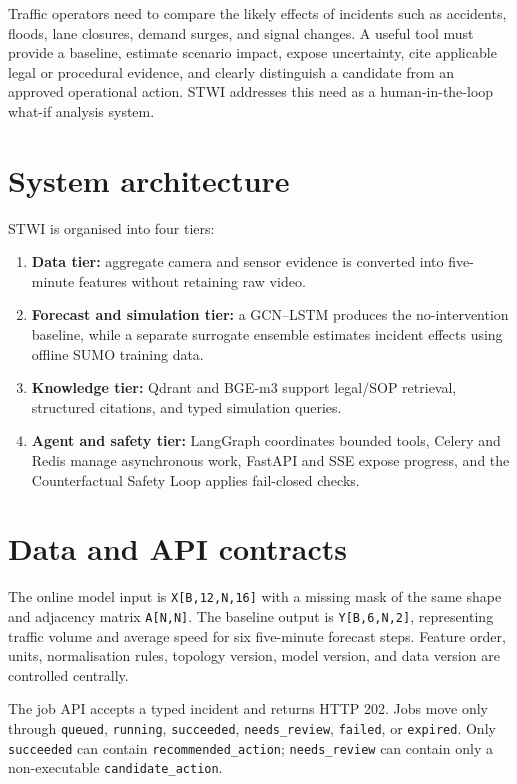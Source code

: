 \documentclass[12pt,a4paper]{report}
\begin{document}
Traffic operators need to compare the likely effects of incidents such as accidents, floods, lane closures, demand surges, and signal changes. A useful tool must provide a baseline, estimate scenario impact, expose uncertainty, cite applicable legal or procedural evidence, and clearly distinguish a candidate from an approved operational action. STWI addresses this need as a human-in-the-loop what-if analysis system.

\section{System architecture}

STWI is organised into four tiers:

\begin{enumerate}[leftmargin=1.2cm]
  \item \textbf{Data tier:} aggregate camera and sensor evidence is converted into five-minute features without retaining raw video.
  \item \textbf{Forecast and simulation tier:} a GCN--LSTM produces the no-intervention baseline, while a separate surrogate ensemble estimates incident effects using offline SUMO training data.
  \item \textbf{Knowledge tier:} Qdrant and BGE-m3 support legal/SOP retrieval, structured citations, and typed simulation queries.
  \item \textbf{Agent and safety tier:} LangGraph coordinates bounded tools, Celery and Redis manage asynchronous work, FastAPI and SSE expose progress, and the Counterfactual Safety Loop applies fail-closed checks.
\end{enumerate}

\section{Data and API contracts}

The online model input is \texttt{X[B,12,N,16]} with a missing mask of the same shape and adjacency matrix \texttt{A[N,N]}. The baseline output is \texttt{Y[B,6,N,2]}, representing traffic volume and average speed for six five-minute forecast steps. Feature order, units, normalisation rules, topology version, model version, and data version are controlled centrally.

The job API accepts a typed incident and returns HTTP 202. Jobs move only through \texttt{queued}, \texttt{running}, \texttt{succeeded}, \texttt{needs\_review}, \texttt{failed}, or \texttt{expired}. Only \texttt{succeeded} can contain \nolinkurl{recommended_action}; \texttt{needs\_review} can contain only a non-executable \nolinkurl{candidate_action}.
\end{document}
